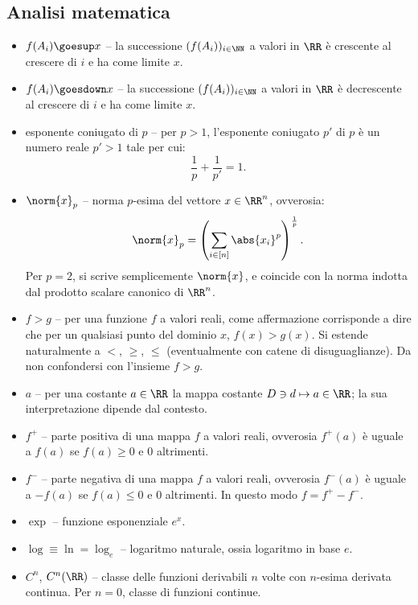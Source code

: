 \begin{multicols*}{2}
    \section*{Analisi matematica}

    \begin{itemize}
        \item $f(A_i) \goesup x$ -- la successione $(f(A_i))_{i \in \NN}$ a valori
        in $\RR$ è crescente al crescere di $i$ e ha come limite $x$.
        \item $f(A_i) \goesdown x$ -- la successione $(f(A_i))_{i \in \NN}$ a valori
        in $\RR$ è decrescente al crescere di $i$ e ha come limite $x$.
        \item esponente coniugato di $p$ -- per $p > 1$, l'esponente coniugato
        $p'$ di $p$ è un numero reale $p' > 1$ tale per cui:
        \[
            \frac{1}{p} + \frac{1}{p'} = 1.
        \]
        \item $\norm{x}_p$ -- norma $p$-esima del vettore $x \in \RR^n$, ovverosia:
        \[
            \norm{x}_p = \left(\sum_{i \in [n]} \abs{x_i}^p\right)^\frac{1}{p}.
        \]
        Per $p = 2$, si scrive semplicemente $\norm{x}$, e coincide con la norma
        indotta dal prodotto scalare canonico di $\RR^n$.
        \item $f > g$ -- per una funzione $f$ a valori reali, come affermazione
        corrisponde a dire che per un qualsiasi punto del dominio $x$, $f(x) > g(x)$. Si estende naturalmente a $<$, $\geq$, $\leq$ (eventualmente con
        catene di disuguaglianze). Da non
        confondersi con l'insieme $f > g$.
        \item $a$ -- per una costante $a \in \RR$ la mappa costante $D \ni d \mapsto a \in \RR$;
        la sua interpretazione dipende dal contesto.
        \item $f^+$ -- parte positiva di una mappa $f$ a valori reali, ovverosia
        $f^+(a)$ è uguale a $f(a)$ se $f(a) \geq 0$ e $0$ altrimenti.
        \item $f^-$ -- parte negativa di una mappa $f$ a valori reali, ovverosia
        $f^-(a)$ è uguale a $-f(a)$ se $f(a) \leq 0$ e $0$ altrimenti. In questo
        modo $f = f^+ - f^-$.
        \item $\exp$ -- funzione esponenziale $e^x$.
        \item $\log \equiv \ln = \log_e$ -- logaritmo naturale, ossia logaritmo in base $e$.
        \item $C^n$, $C^n(\RR)$ -- classe delle funzioni derivabili $n$ volte con $n$-esima derivata continua. Per $n = 0$, classe di funzioni continue.

\end{itemize}
\end{multicols*}
